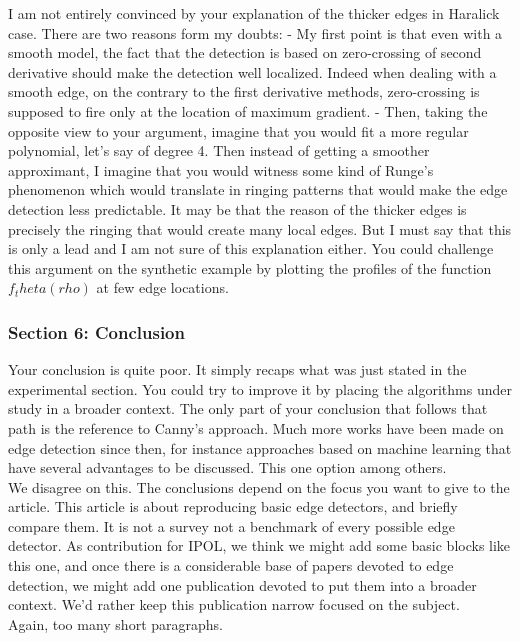 \documentclass[a4paper,10pt]{report}
\begin{document}
I am not entirely convinced by your explanation of the thicker edges in
Haralick case. There are two reasons form my doubts:
- My first point is that even with a smooth model, the fact that the detection
is based on zero-crossing of second derivative should make the detection well localized. Indeed when dealing with a smooth edge, on the contrary to the
first derivative methods, zero-crossing is supposed to fire only at the
location of maximum gradient.
- Then, taking the opposite view to your argument, imagine that you would fit a more regular polynomial, let's say of degree 4. Then instead of getting a
smoother approximant, I imagine that you would witness some kind of Runge's
phenomenon which would translate in ringing patterns that would make the edge detection less predictable. It may be that the reason of the thicker edges is precisely the ringing that would create many local edges. But I must say that
this is only a lead and I am not sure of this explanation either. You could
challenge this argument on the synthetic example by plotting the profiles of
the function $f_theta(rho)$ at few edge locations.


\subsubsection{ Section 6: Conclusion}
\que Your conclusion is quite poor. It simply recaps what was just stated in the
experimental section. You could try to improve it by placing the
algorithms under study in a broader context. The only part of your conclusion
that follows that path is the reference to Canny's approach. Much more
works have been made on edge detection since then, for instance approaches
based on machine learning that have several advantages to be discussed. This one option among others.\\

\ans We disagree on this. The conclusions depend on the focus you want to give to the article. This article is about reproducing basic edge detectors, and briefly compare them. It is not a survey not a benchmark of every possible edge detector. As contribution for IPOL, we think we might add some basic blocks like this one, and once there is a considerable base of papers devoted to edge detection, we might add one publication devoted to put them into a broader context. We'd rather keep this publication narrow focused on the subject.\\

\que Again, too many short paragraphs.\\
\end{document}
